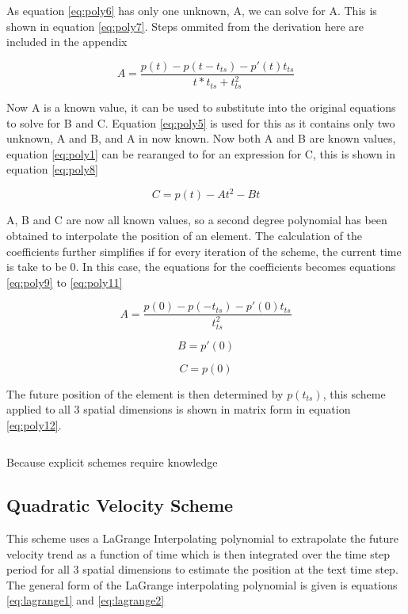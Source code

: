 As equation \ref{eq:poly6} has only one unknown, A, we can solve for A. This is shown in equation \ref{eq:poly7}. Steps ommited from the derivation here are included in the appendix

\begin{equation}
\label{eq:poly7}
A=\frac{p(t)-p(t-t_{ts})-p'(t)t_{ts}}{t*t_{ts}+t_{ts}^2}
\end{equation}

Now A is a known value, it can be used to substitute into the original equations to solve for B and C. Equation \ref{eq:poly5} is used for this as it contains only two unknown, A and B, and A in now known. Now both A and B are known values, equation \ref{eq:poly1} can be rearanged to for an expression for C, this is shown in equation \ref{eq:poly8}

\begin{equation}
\label{eq:poly8}
C=p(t)-At^2-Bt
\end{equation}

A, B and C are now all known values, so a second degree polynomial has been obtained to interpolate the position of an element. The calculation of the coefficients further simplifies if for every iteration of the scheme, the current time is take to be 0. In this case, the equations for the coefficients becomes equations \ref{eq:poly9} to \ref{eq:poly11}

\begin{equation}
\label{eq:poly9}
A=\frac{p(0)-p(-t_{ts})-p'(0)t_{ts}}{t_{ts}^2}
\end{equation}

\begin{equation}
\label{eq:poly10}
B=p'(0)
\end{equation}

\begin{equation}
\label{eq:poly11}
C=p(0)
\end{equation}

The future position of the element is then determined by $p(t_{ts})$, this scheme applied to all 3 spatial dimensions is shown in matrix form in equation \ref{eq:poly12}.

\begin{equation}
\label{eq:poly12}
\end{equation}

Because explicit schemes require knowledge

\subsection{Quadratic Velocity Scheme}
This scheme uses a LaGrange Interpolating polynomial to extrapolate the future velocity trend as a function of time which is then integrated over the time step period for all 3 spatial dimensions to estimate the position at the text time step. The general form of the LaGrange interpolating polynomial is given is equations \ref{eq:lagrange1} and \ref{eq:lagrange2}

